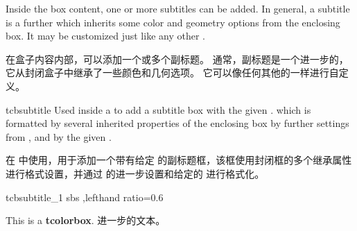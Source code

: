 Inside the box content, one or more subtitles can be added.
In general, a subtitle is a further  which inherits some color and geometry options from the enclosing box. 
It may be customized just like any other .


在盒子内容内部，可以添加一个或多个副标题。 通常，副标题是一个进一步的，它从封闭盒子中继承了一些颜色和几何选项。 它可以像任何其他的一样进行自定义。

\begin{docCommand}[doc new=2014-10-10]{tcbsubtitle}{}
Used inside a  to add a subtitle box with the given .
which is formatted by several inherited properties of the enclosing box
by further settings from , and by the given .

在  中使用，用于添加一个带有给定  的副标题框，该框使用封闭框的多个继承属性进行格式设置，并通过  的进一步设置和给定的  进行格式化。

\begin{exdispExample*}{tcbsubtitle_1}{%
sbs%
,lefthand ratio=0.6%
}
\begin{tcolorbox}[title=我的标题,
colback=red!5!white,
colframe=red!75!black,
fonttitle=\bfseries]
  This is a \textbf{tcolorbox}.
进一步的文本。
\end{tcolorbox}
\end{exdispExample*}





\end{docCommand}
